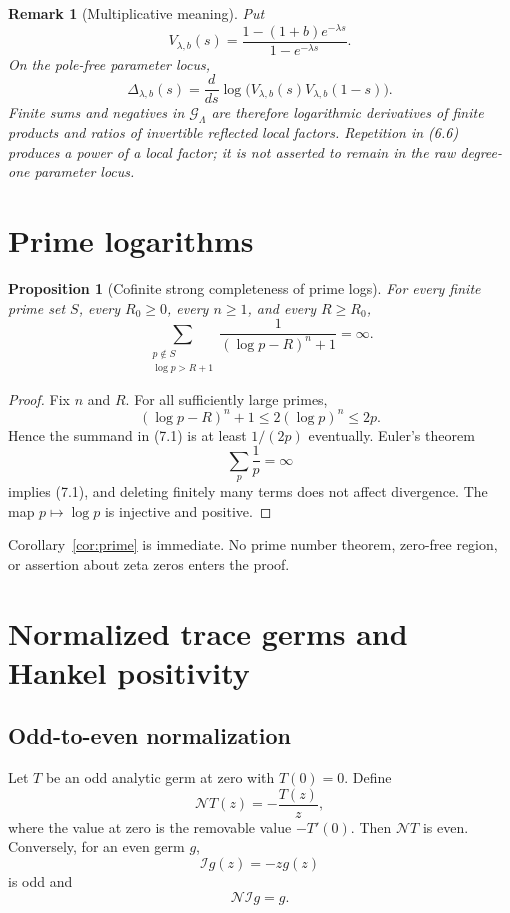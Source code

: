\documentclass[11pt]{article}
\newtheorem{proposition}[theorem]{Proposition}
\newtheorem{remark}[theorem]{Remark}
\newcommand{\cG}{\mathcal G}
\begin{document}
\begin{remark}[Multiplicative meaning]
Put
\[
 V_{\lambda,b}(s)
 =\frac{1-(1+b)e^{-\lambda s}}{1-e^{-\lambda s}}.
 \tag{6.8}
\]
On the pole-free parameter locus,
\[
 \Delta_{\lambda,b}(s)
 =\frac{d}{ds}\log\!\bigl(V_{\lambda,b}(s)V_{\lambda,b}(1-s)\bigr).
 \tag{6.9}
\]
Finite sums and negatives in \(\cG_\Lambda\) are therefore logarithmic
derivatives of finite products and ratios of invertible reflected local factors.
Repetition in (6.6) produces a power of a local factor; it is not asserted to remain
in the raw degree-one parameter locus.
\end{remark}

\section{Prime logarithms}

\begin{proposition}[Cofinite strong completeness of prime logs]\label{prop:primelog}
For every finite prime set \(S\), every \(R_0\geq0\), every \(n\geq1\), and
every \(R\geq R_0\),
\[
 \sum_{\substack{p\notin S\\ \log p>R+1}}
 \frac{1}{(\log p-R)^n+1}=\infty.
 \tag{7.1}
\]
\end{proposition}

\begin{proof}
Fix \(n\) and \(R\).  For all sufficiently large primes,
\[
 (\log p-R)^n+1\leq 2(\log p)^n\leq 2p.
 \tag{7.2}
\]
Hence the summand in (7.1) is at least \(1/(2p)\) eventually.  Euler's theorem
\[
 \sum_p\frac1p=\infty
 \tag{7.3}
\]
implies (7.1), and deleting finitely many terms does not affect divergence.
The map \(p\mapsto\log p\) is injective and positive.
\end{proof}

Corollary~\ref{cor:prime} is immediate.  No prime number theorem, zero-free region,
or assertion about zeta zeros enters the proof.

\section{Normalized trace germs and Hankel positivity}

\subsection{Odd-to-even normalization}

Let \(T\) be an odd analytic germ at zero with \(T(0)=0\).  Define
\[
 \mathcal N T(z)=-\frac{T(z)}{z},
\tag{8.1}
\]
where the value at zero is the removable value \(-T'(0)\).  Then
\(\mathcal NT\) is even.  Conversely, for an even germ \(g\),
\[
 \mathcal I g(z)=-zg(z)
\tag{8.2}
\]
is odd and
\[
 \mathcal N\mathcal I g=g.
\tag{8.3}
\]
\end{document}
